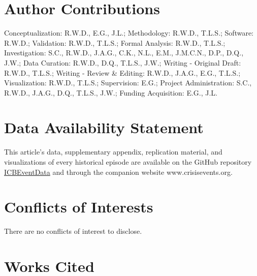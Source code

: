 \documentclass{article}
\begin{document}
\hypertarget{author-contributions}{%
\section{Author Contributions}\label{author-contributions}}

Conceptualization: R.W.D., E.G., J.L.; Methodology: R.W.D., T.L.S.;
Software: R.W.D.; Validation: R.W.D., T.L.S.; Formal Analysis: R.W.D.,
T.L.S.; Investigation: S.C., R.W.D., J.A.G., C.K., N.L., E.M., J.M.C.N.,
D.P., D.Q., J.W.; Data Curation: R.W.D., D.Q., T.L.S., J.W.; Writing -
Original Draft: R.W.D., T.L.S.; Writing - Review \& Editing: R.W.D.,
J.A.G., E.G., T.L.S.; Visualization: R.W.D., T.L.S.; Supervision: E.G.;
Project Administration: S.C., R.W.D., J.A.G., D.Q., T.L.S., J.W.;
Funding Acquisition: E.G., J.L.

\hypertarget{data-availability-statement}{%
\section{Data Availability
Statement}\label{data-availability-statement}}

This article's data, supplementary appendix, replication material, and
visualizations of every historical episode are available on the GitHub
repository
\href{https://urldefense.com/v3/__https://github.com/CenterForPeaceAndSecurityStudies/ICBEventData__;!!Mih3wA!WxDJtEczKfxGTh0S2Krunap8ReymFEL5iTWaSfOHeqlSdyfRx77zmjBSWO1OAm13$}{ICBEventData}
and through the companion website www.crisisevents.org.

\hypertarget{conflicts-of-interests}{%
\section{Conflicts of Interests}\label{conflicts-of-interests}}

There are no conflicts of interest to disclose.

\clearpage

\hypertarget{works-cited}{%
\section*{Works Cited}\label{works-cited}}
\end{document}
